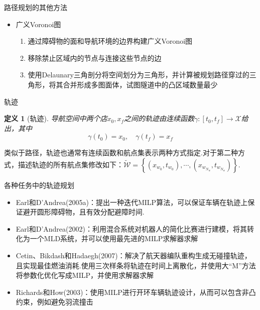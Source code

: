 \documentclass[notheorems,11pt]{beamer}
\theoremstyle{plain}
\numberwithin{theorem}{section}
\newtheorem{definition}{定义}
\numberwithin{lemma}{section}
\numberwithin{corollary}{section}
\theoremstyle{example}
\begin{document}
\begin{frame}{路径规划的其他方法}
  \begin{itemize}
    \item 广义Voronoi图
    \begin{enumerate}
      \item 通过障碍物的面和导航环境的边界构建广义Voronoi图
      \item 移除禁止区域内的节点与连接这些节点的边
      \item 使用Delaunary三角剖分将空间划分为三角形，并计算被规划路径穿过的三角形，将其合并形成多图面体，试图隧道中的凸区域数量最少
    \end{enumerate}
  \end{itemize}

\end{frame}

\begin{frame}{轨迹}
  \begin{definition}[轨迹]
    导航空间中两个店$x_0,x_f$之间的轨迹由连续函数$\gamma:[t_0,t_f]\to \mathcal{X}$给出，其中
    \begin{equation}
      \gamma(t_0)=x_0,\quad \gamma(t_f)=x_f
    \end{equation}
  \end{definition}
  类似于路径，轨迹也通常有连续函数和航点集表示两种方式指定.对于第二种方式，描述轨迹的所有航点集修改如下：$\widetilde{\mathcal{W}}=\left\{\left(x_{w_0},t_{w_0}\right),\cdots,\left(x_{w_{N_w}},t_{w_{N_w}}\right)\right\}$.
\end{frame}

\begin{frame}{各种任务中的轨迹规划}
  \begin{itemize}
    \item Earl和D'Andrea(2005a)：提出一种迭代MILP算法，可以保证车辆在轨迹上保证避开圆形障碍物，且有效分配避障时间.
    \item Earl和D'Andrea(2002)：利用混合系统对机器人的简化比赛进行建模，将其转化为一个MLD系统，并可以使用最先进的MILP求解器求解
    \item Cetin、Bikdash和Hadaegh(2007)：解决了航天器编队重构生成无碰撞轨迹，且实现最佳燃油消耗.使用三次样条将轨迹在时间上离散化，并使用大“M”方法将参数化优化写成MILP，并使用求解器求解
    \item Richards和How(2003)：使用MILP进行开环车辆轨迹设计，从而可以包含非凸约束，例如避免羽流撞击
  \end{itemize}
\end{frame}
\end{document}
